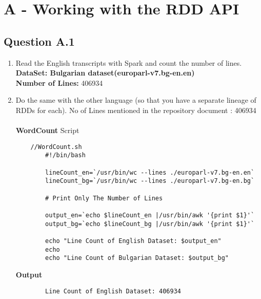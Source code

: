 \documentclass[12pt]{article}
\begin{document}
\section{A - Working with the RDD API}
\subsection{Question A.1}
\begin{enumerate}
\item Read the English transcripts with Spark and count the number of lines.
\newline
\newline
	\textbf{DataSet: Bulgarian dataset(europarl-v7.bg-en.en)}
    \\
    \textbf{Number of Lines:} 406934
\newline
\item  Do the same with the other language (so that you have a separate lineage of RDDs for each).
\newline
\newline
	No of Lines mentioned in the repository document : 406934
    \\
    \\
    \textbf{WordCount} Script
    \begin{lstlisting}
    //WordCount.sh
		#!/bin/bash

		lineCount_en=`/usr/bin/wc --lines ./europarl-v7.bg-en.en`
		lineCount_bg=`/usr/bin/wc --lines ./europarl-v7.bg-en.bg`

		# Print Only The Number of Lines

		output_en=`echo $lineCount_en |/usr/bin/awk '{print $1}'`
		output_bg=`echo $lineCount_bg |/usr/bin/awk '{print $1}'`

		echo "Line Count of English Dataset: $output_en"
		echo
		echo "Line Count of Bulgarian Dataset: $output_bg"
	\end{lstlisting}
   	\textbf{Output}
    \begin{lstlisting}
    	Line Count of English Dataset: 406934


\end{lstlisting}
\end{enumerate}
\end{document}
